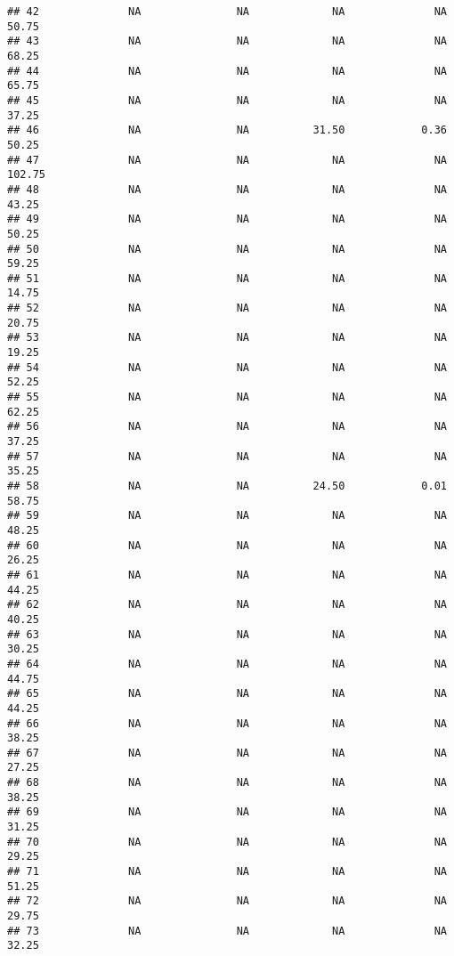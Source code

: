 \documentclass[]{article}
\begin{document}
\begin{verbatim}
## 42              NA               NA             NA              NA       50.75
## 43              NA               NA             NA              NA       68.25
## 44              NA               NA             NA              NA       65.75
## 45              NA               NA             NA              NA       37.25
## 46              NA               NA          31.50            0.36       50.25
## 47              NA               NA             NA              NA      102.75
## 48              NA               NA             NA              NA       43.25
## 49              NA               NA             NA              NA       50.25
## 50              NA               NA             NA              NA       59.25
## 51              NA               NA             NA              NA       14.75
## 52              NA               NA             NA              NA       20.75
## 53              NA               NA             NA              NA       19.25
## 54              NA               NA             NA              NA       52.25
## 55              NA               NA             NA              NA       62.25
## 56              NA               NA             NA              NA       37.25
## 57              NA               NA             NA              NA       35.25
## 58              NA               NA          24.50            0.01       58.75
## 59              NA               NA             NA              NA       48.25
## 60              NA               NA             NA              NA       26.25
## 61              NA               NA             NA              NA       44.25
## 62              NA               NA             NA              NA       40.25
## 63              NA               NA             NA              NA       30.25
## 64              NA               NA             NA              NA       44.75
## 65              NA               NA             NA              NA       44.25
## 66              NA               NA             NA              NA       38.25
## 67              NA               NA             NA              NA       27.25
## 68              NA               NA             NA              NA       38.25
## 69              NA               NA             NA              NA       31.25
## 70              NA               NA             NA              NA       29.25
## 71              NA               NA             NA              NA       51.25
## 72              NA               NA             NA              NA       29.75
## 73              NA               NA             NA              NA       32.25

\end{verbatim}
\end{document}
